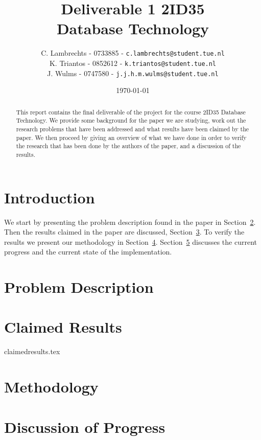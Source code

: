 \documentclass[a4paper,twoside,11pt]{article}
\title{\vspace{-\baselineskip}\sffamily\bfseries Deliverable 1 2ID35 \\ Database Technology }
\author{
C. Lambrechts - 0733885 - {\tt c.lambrechts@student.tue.nl} \\
K. Triantos - 0852612 - {\tt k.triantos@student.tue.nl}\\
J. Wulms - 0747580 - {\tt j.j.h.m.wulms@student.tue.nl}\\
}
\date{\today}
\numberwithin{equation}{section}
\begin{document}
\maketitle
\thispagestyle{empty}
\begin{abstract}
This report contains the final deliverable of the project for the course 2ID35 Database Technology. We provide some background for the paper we are studying, work out the research problems that have been addressed and what results have been claimed by the paper. We then proceed by giving an overview of what we have done in order to verify the research that has been done by the authors of the paper, and a discussion of the results.
\end{abstract}

\section{Introduction} \label{sec:Introduction}


We start by presenting the problem description found in the paper in Section~\ref{sec:ProblemDescription}. Then the results claimed in the paper are discussed, Section~\ref{sec:ClaimedResults}. To verify the results we present our methodology in Section~\ref{sec:Methodology}. Section~\ref{sec:Discussion} discusses the current progress and the current state of the implementation.

\section{Problem Description} \label{sec:ProblemDescription}


\section{Claimed Results} \label{sec:ClaimedResults}
 {claimedresults.tex}

\section{Methodology} \label{sec:Methodology}


\section{Discussion of Progress} \label{sec:Discussion}


%


\end{document}

